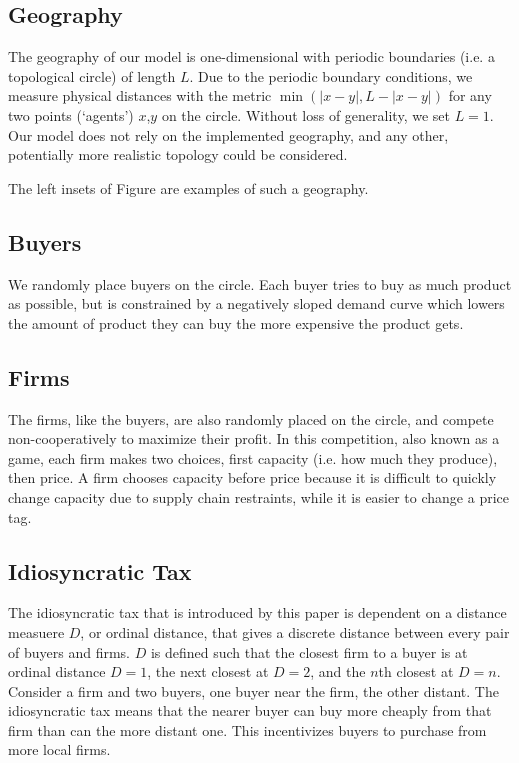 \documentclass[11pt]{article}
\begin{document}
\subsection{Geography}
The geography of our model is one-dimensional with periodic boundaries (i.e.
a topological circle) of length $L$. Due to the periodic boundary conditions,
we measure physical distances with the metric $\min(|x-y|, L-|x-y|)$ for any
two points (`agents') $x$,$y$ on the circle. Without loss of generality, we set
$L=1$. Our model does not rely on the implemented geography, and any other,
potentially more realistic topology could be considered.

The left insets of Figure \pageref{fig:fig3x2SingleTimestep} are examples of
such a geography.

\subsection{Buyers}
We randomly place buyers on the circle. Each buyer tries to buy as much product
as possible, but is constrained by a negatively sloped demand curve which
lowers the amount of product they can buy the more expensive the product gets.

\subsection{Firms}
The firms, like the buyers, are also randomly placed on the circle, and compete
non-cooperatively to maximize their profit. In this competition, also known as
a game, each firm makes two choices, first capacity (i.e. how much they
produce), then price. A firm chooses capacity before price because it is
difficult to quickly change capacity due to supply chain restraints, while it
is easier to change a price tag.

\subsection{Idiosyncratic Tax}
The idiosyncratic tax that is introduced by this paper is dependent on a
distance measuere $D$, or ordinal distance, that gives a discrete distance
between every pair of buyers and firms. $D$ is defined such that the closest
firm to a buyer is at ordinal distance $D=1$, the next closest at $D=2$, and
the $n$th closest at $D=n$. Consider a firm and two buyers, one buyer near the
firm, the other distant. The idiosyncratic tax means that the nearer buyer can
buy more cheaply from that firm than can the more distant one. This
incentivizes buyers to purchase from more local firms.
\end{document}
